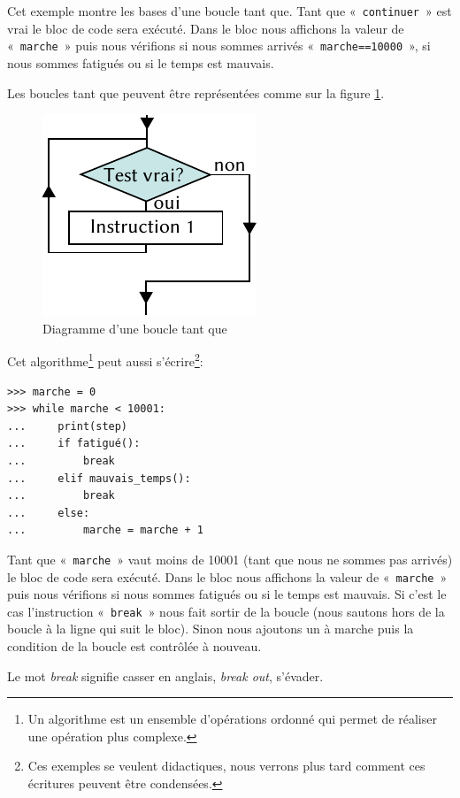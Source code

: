 Cet exemple montre les bases d'une boucle tant que. Tant que «~\texttt{continuer}~» est vrai le bloc de code sera exécuté. Dans le bloc nous affichons la valeur de «~\texttt{marche}~» puis nous vérifions si nous sommes arrivés «~\texttt{marche==10000}~», si nous sommes fatigués ou si le temps est mauvais.

Les boucles tant que peuvent être représentées comme sur la figure \ref{fig:Cf-while-fr}.
\begin{figure}[h!]
\centering
\includegraphics[scale=1.5]{images/Cf-while-fr.pdf}
\caption{Diagramme d'une boucle tant que}
\label{fig:Cf-while-fr}
\end{figure}

Cet algorithme\footnote{Un algorithme est un ensemble d'opérations ordonné qui permet de réaliser une opération plus complexe.} peut aussi s'écrire\footnote{Ces exemples se veulent didactiques, nous verrons plus tard comment ces écritures peuvent être condensées.}:

\begin{Verbatim}[frame=single,rulecolor=\color{gray}, label=ne pas saisir]
>>> marche = 0
>>> while marche < 10001:
...     print(step)
...     if fatigué():
...         break
...     elif mauvais_temps():
...         break
...     else:
...         marche = marche + 1 
\end{Verbatim}

Tant que «~\texttt{marche}~» vaut moins de 10001 (tant que nous ne sommes pas arrivés) le bloc de code sera exécuté. Dans le bloc nous affichons la valeur de «~\texttt{marche}~» puis nous vérifions si nous sommes fatigués ou si le temps est mauvais. Si c'est le cas l'instruction «~\texttt{break}~» nous fait sortir de la boucle (nous sautons hors de la boucle à la ligne qui suit le bloc). Sinon nous ajoutons un à marche puis la condition de la boucle est contrôlée à nouveau.

Le mot \emph{break} signifie casser en anglais, \emph{break out}, s'évader.\\


